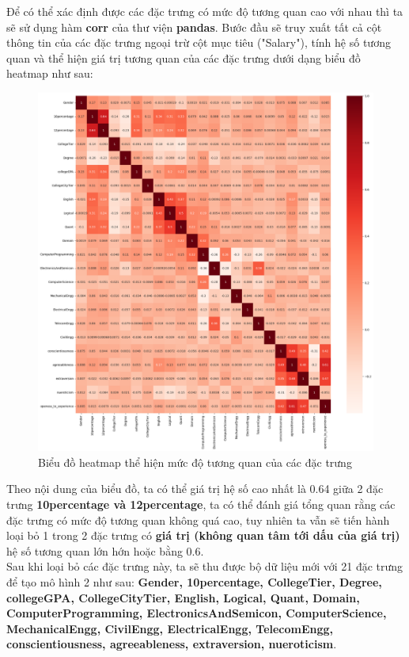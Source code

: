 \documentclass{report}
\begin{document}
    Để có thể xác định được các đặc trưng có mức độ tương quan cao với nhau thì ta sẽ sử dụng hàm \textbf{corr} của thư viện \textbf{pandas}. Bước đầu sẽ truy xuất tất cả cột thông tin của các đặc trưng ngoại trừ cột mục tiêu ("Salary"), tính hệ số tương quan và thể hiện giá trị tương quan của các đặc trưng dưới dạng biểu đồ heatmap như sau:
    \begin{figure}[H]
        \includegraphics[width=\textwidth, keepaspectratio]{assets/heatmap.png}
        \centering
        \caption{Biểu đồ heatmap thể hiện mức độ tương quan của các đặc trưng}
    \end{figure}

    Theo nội dung của biểu đồ, ta có thể  giá trị hệ số  cao nhất là 0.64 giữa 2 đặc trưng \textbf{10percentage và 12percentage}, ta có thể đánh giá tổng quan rằng các đặc trưng có mức độ tương quan không quá cao, tuy nhiên ta vẫn sẽ tiến hành loại bỏ 1 trong 2 đặc trưng có \textbf{giá trị (không quan tâm tới dấu của giá trị)} hệ số tương quan lớn hớn hoặc bằng 0.6.\\
    
    Sau khi loại bỏ các đặc trưng này, ta sẽ thu được bộ dữ liệu mới với 21 đặc trưng để tạo mô hình 2 như sau: \textbf{Gender, 10percentage, CollegeTier, Degree, collegeGPA, CollegeCityTier, English, Logical, Quant, Domain,
    ComputerProgramming, ElectronicsAndSemicon, ComputerScience, MechanicalEngg, CivilEngg, ElectricalEngg, TelecomEngg, conscientiousness, agreeableness, extraversion, nueroticism}.
\end{document}
